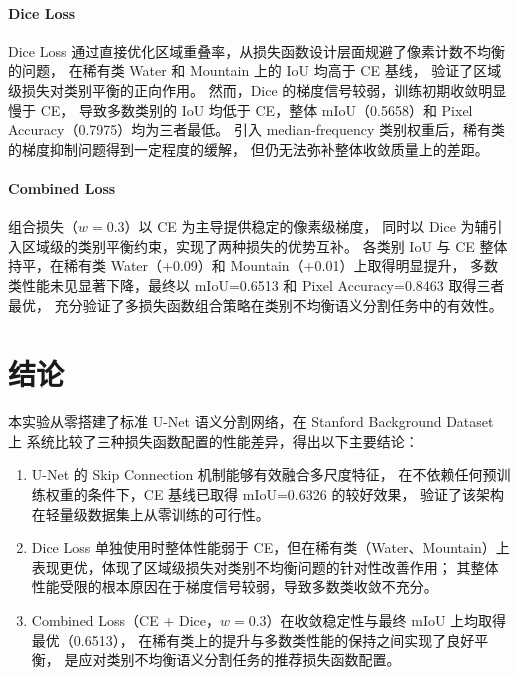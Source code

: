 \documentclass[12pt, a4paper]{article}
\begin{document}
\paragraph{Dice Loss}
Dice Loss 通过直接优化区域重叠率，从损失函数设计层面规避了像素计数不均衡的问题，
在稀有类 Water 和 Mountain 上的 IoU 均高于 CE 基线，
验证了区域级损失对类别平衡的正向作用。
然而，Dice 的梯度信号较弱，训练初期收敛明显慢于 CE，
导致多数类别的 IoU 均低于 CE，整体 mIoU（0.5658）和 Pixel Accuracy（0.7975）均为三者最低。
引入 median-frequency 类别权重后，稀有类的梯度抑制问题得到一定程度的缓解，
但仍无法弥补整体收敛质量上的差距。

\paragraph{Combined Loss}
组合损失（$w=0.3$）以 CE 为主导提供稳定的像素级梯度，
同时以 Dice 为辅引入区域级的类别平衡约束，实现了两种损失的优势互补。
各类别 IoU 与 CE 整体持平，在稀有类 Water（+0.09）和 Mountain（+0.01）上取得明显提升，
多数类性能未见显著下降，最终以 mIoU=0.6513 和 Pixel Accuracy=0.8463 取得三者最优，
充分验证了多损失函数组合策略在类别不均衡语义分割任务中的有效性。

\section{结论}

本实验从零搭建了标准 U-Net 语义分割网络，在 Stanford Background Dataset 上
系统比较了三种损失函数配置的性能差异，得出以下主要结论：

\begin{enumerate}
    \item U-Net 的 Skip Connection 机制能够有效融合多尺度特征，
          在不依赖任何预训练权重的条件下，CE 基线已取得 mIoU=0.6326 的较好效果，
          验证了该架构在轻量级数据集上从零训练的可行性。
    \item Dice Loss 单独使用时整体性能弱于 CE，但在稀有类（Water、Mountain）上
          表现更优，体现了区域级损失对类别不均衡问题的针对性改善作用；
          其整体性能受限的根本原因在于梯度信号较弱，导致多数类收敛不充分。
    \item Combined Loss（CE + Dice，$w=0.3$）在收敛稳定性与最终 mIoU 上均取得最优（0.6513），
          在稀有类上的提升与多数类性能的保持之间实现了良好平衡，
          是应对类别不均衡语义分割任务的推荐损失函数配置。
\end{enumerate}
\end{document}
